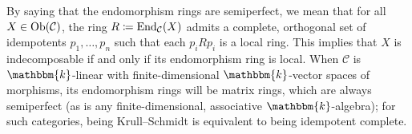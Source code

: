 \noindent By saying that the endomorphism rings are semiperfect, we mean that for all $X \in \textup{Ob}(\mathcal{C})$, the ring $R \coloneqq \textup{End}_\mathcal{C}(X)$ admits a complete, orthogonal set of idempotents $p_1, \dots, p_n$ such that each $p_iRp_i$ is a local ring. This implies that $X$ is indecomposable if and only if its endomorphism ring is local. When $\mathcal{C}$ is $\mathbbm{k}$-linear with finite-dimensional $\mathbbm{k}$-vector spaces of morphisms, its endomorphism rings will be matrix rings, which are always semiperfect (as is any finite-dimensional, associative $\mathbbm{k}$-algebra); for such categories, being Krull--Schmidt is equivalent to being idempotent complete.\\



